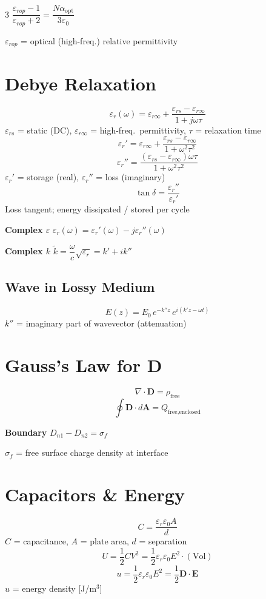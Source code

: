 \documentclass[9pt]{extarticle}
\newcommand{\eqlabel}[1]{\textbf{\scriptsize #1}\;}
\newcommand{\vardef}[1]{{\footnotesize\color{defgray}#1}}
\begin{document}
\begin{multicols}{3}
$\dfrac{\varepsilon_{rop}-1}{\varepsilon_{rop}+2} = \dfrac{N\alpha_{\text{opt}}}{3\varepsilon_0}$

\vardef{$\varepsilon_{rop}$ = optical (high-freq.) relative permittivity}

\section{Debye Relaxation}
\[\varepsilon_r(\omega) = \varepsilon_{r\infty} + \frac{\varepsilon_{rs}-\varepsilon_{r\infty}}{1+j\omega\tau}\]
\vardef{$\varepsilon_{rs}$ = static (DC), $\varepsilon_{r\infty}$ = high-freq.\ permittivity, $\tau$ = relaxation time}
\[\varepsilon_r' = \varepsilon_{r\infty} + \frac{\varepsilon_{rs}-\varepsilon_{r\infty}}{1+\omega^2\tau^2}\]
\[\varepsilon_r'' = \frac{(\varepsilon_{rs}-\varepsilon_{r\infty})\omega\tau}{1+\omega^2\tau^2}\]
\vardef{$\varepsilon_r'$ = storage (real), $\varepsilon_r''$ = loss (imaginary)}
\[\tan\delta = \frac{\varepsilon_r''}{\varepsilon_r'}\]
\vardef{Loss tangent; energy dissipated / stored per cycle}

\eqlabel{Complex $\varepsilon$} $\varepsilon_r(\omega) = \varepsilon_r'(\omega) - j\varepsilon_r''(\omega)$

\eqlabel{Complex $k$} $\tilde{k} = \dfrac{\omega}{c}\sqrt{\varepsilon_r} = k' + ik''$

\subsection{Wave in Lossy Medium}
\[E(z) = E_0\,e^{-k''z}\,e^{i(k'z-\omega t)}\]
\vardef{$k''$ = imaginary part of wavevector (attenuation)}

\section{Gauss's Law for D}
\[\nabla\cdot\mathbf{D} = \rho_{\text{free}}\]
\[\oint\mathbf{D}\cdot d\mathbf{A} = Q_{\text{free,enclosed}}\]

\eqlabel{Boundary} $D_{n1} - D_{n2} = \sigma_f$

\vardef{$\sigma_f$ = free surface charge density at interface}

\section{Capacitors \& Energy}
\[C = \frac{\varepsilon_r\varepsilon_0 A}{d}\]
\vardef{$C$ = capacitance, $A$ = plate area, $d$ = separation}
\[U = \frac{1}{2}CV^2 = \frac{1}{2}\varepsilon_r\varepsilon_0 E^2\cdot(\text{Vol})\]
\[u = \frac{1}{2}\varepsilon_r\varepsilon_0 E^2 = \frac{1}{2}\mathbf{D}\cdot\mathbf{E}\]
\vardef{$u$ = energy density [J/m$^3$]}


\end{multicols}
\end{document}
